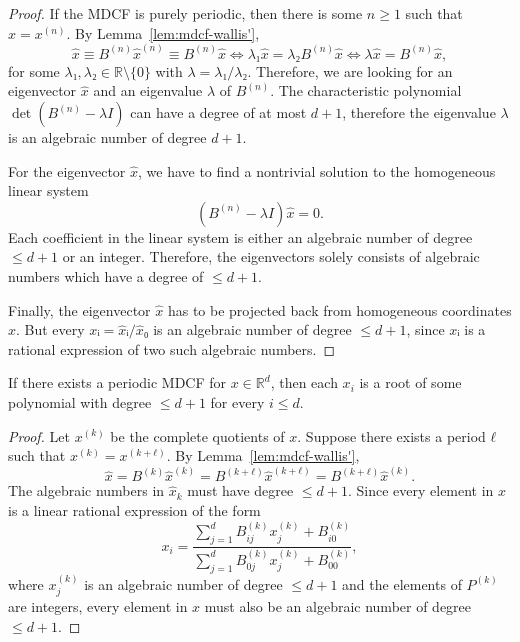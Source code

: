 \begin{proof}
  If the MDCF is purely periodic, then there is some $n ≥ 1$ such that $x = x^{(n)}$.
  By Lemma~\ref{lem:mdcf-wallis'},
  \[
    \hat x ≡ B^{(n)} \hat x^{(n)} ≡ B^{(n)} \hat x \iff λ₁ \hat x = λ₂ B^{(n)} \hat x \iff λ \hat x = B^{(n)} \hat x,
  \]
  for some $λ₁, λ₂ ∈ ℝ \setminus \{0\}$ with $λ = λ₁/λ₂$.
  Therefore, we are looking for an eigenvector $\hat x$ and an eigenvalue $λ$ of $B^{(n)}$.
  The characteristic polynomial $\det(B^{(n)} - λ I)$ can have a degree of at most $d+1$,
  therefore the eigenvalue $λ$ is an algebraic number of degree $d+1$.

  For the eigenvector $\hat x$, we have to find a nontrivial solution to the
  homogeneous linear system
  \[
    (B^{(n)} - λ I) \hat x = 0.
  \]
  Each coefficient in the linear system is either an algebraic
  number of degree $≤ d+1$ or an integer.
  Therefore, the eigenvectors solely consists of algebraic numbers which have a
  degree of $≤ d+1$.

  Finally, the eigenvector $\hat x$ has to be projected back from homogeneous coordinates $x$.
  But every $xᵢ = \hat xᵢ / \hat x₀$ is an algebraic number of degree $≤ d+1$,
  since $xᵢ$ is a rational expression of two such algebraic numbers.
\end{proof}

\begin{theorem}
  \label{thm:mdcf-periodic}
  If there exists a periodic MDCF for $x ∈ ℝ^d$,
  then each $x_i$ is a root of some polynomial with degree $≤ d+1$ for every $i ≤ d$.
\end{theorem}

\begin{proof}
  Let $x^{(k)}$ be the complete quotients of $x$.
  Suppose there exists a period $ℓ$ such that $x^{(k)} = x^{(k+ℓ)}$.
  By Lemma~\ref{lem:mdcf-wallis'},
  \[
    \hat x = B^{(k)} \hat x^{(k)} = B^{(k+ℓ)} \hat x^{(k+ℓ)} = B^{(k+ℓ)} \hat x^{(k)}.
  \]
  The algebraic numbers in $\hat x_k$ must have degree $≤ d+1$.
  Since every element in $x$ is a linear rational expression of the form
  \[
    x_i = \frac{∑_{j=1}^d B_{ij}^{(k)} x_j^{(k)} + B_{i0}^{(k)}}{\sum_{j=1}^d B_{0j}^{(k)} x_j^{(k)} + B_{00}^{(k)}},
  \]
  where $x_j^{(k)}$ is an algebraic number of degree $≤ d+1$ and the elements of $P^{(k)}$ are integers,
  every element in $x$ must also be an algebraic number of degree $≤ d+1$.
\end{proof}
